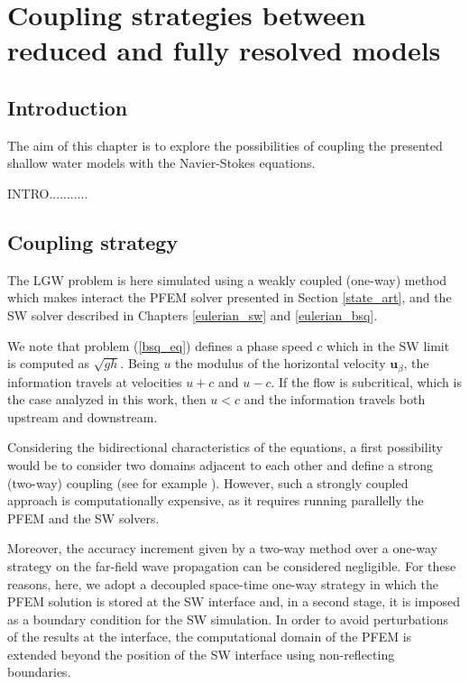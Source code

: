 
\chapter{Coupling strategies between reduced and fully resolved models}
\label{coupling}


\section{Introduction}



The aim of this chapter is to explore the possibilities of coupling the presented shallow water models with the Navier-Stokes equations.

INTRO...........


\section{Coupling strategy}


The LGW problem is here simulated using a weakly coupled (one-way) method which makes interact the PFEM solver presented in Section \ref{state_art}, and the SW solver described in Chapters \ref{eulerian_sw} and \ref{eulerian_bsq}. 

We note that problem (\ref{bsq_eq}) defines a phase speed $c$ which in the SW limit is computed as $\sqrt{gh}$. Being $u$ the modulus of the horizontal velocity $\mathbf{u}_\beta$, the information travels at velocities $u+c$ and $u-c$. If the flow is subcritical, which is the case analyzed in this work, then $u<c$ and the information travels both upstream and downstream.

Considering the bidirectional characteristics of the equations, a first possibility would be to consider two domains adjacent to each other and define a strong (two-way) coupling (see for example \cite{pringle2016}).
However, such a strongly coupled approach is computationally expensive, as it requires running parallelly the PFEM and the SW solvers. 

Moreover, the accuracy increment given by a two-way method over a one-way strategy on the far-field wave propagation can be considered negligible. For these reasons, here, we adopt a decoupled space-time one-way strategy in which the PFEM solution is stored at the SW interface and, in a second stage, it is imposed as a boundary condition for the SW simulation. In order to avoid perturbations of the results at the interface, the computational domain of the PFEM is extended beyond the position of the SW interface using non-reflecting boundaries.



